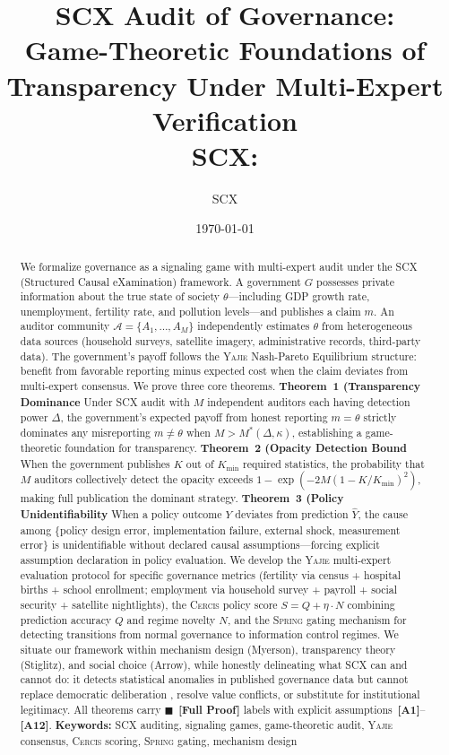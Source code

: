 \documentclass[11pt,a4paper]{article}
\title{\textbf{SCX Audit of Governance:}\\
\large Game-Theoretic Foundations of Transparency Under Multi-Expert Verification\\
\small SCX: }
\author{SCX}
\date{\today}
\theoremstyle{definition}
\newcommand{\rigorFull}[0]{$\blacksquare$~\textbf{[Full Proof]}}
\newcommand{\Yajie}{\textsc{Yajie}}
\newcommand{\Spring}{\textsc{Spring}}
\newcommand{\Cercis}{\textsc{Cercis}}
\newcommand{\SCX}{\textsc{SCX}}
\newcommand{\assumptionTag}[1]{\textsf{\textbf{[A#1]}}}
\begin{document}
\maketitle
\begin{abstract}
We formalize governance as a signaling game with multi-expert audit under the \SCX{} (Structured Causal eXamination) framework. A government $G$ possesses private information about the true state of society $\theta$---including GDP growth rate, unemployment, fertility rate, and pollution levels---and publishes a claim $m$. An auditor community $\mathcal{A} = \{A_1, \ldots, A_M\}$ independently estimates $\theta$ from heterogeneous data sources (household surveys, satellite imagery, administrative records, third-party data). The government's payoff follows the \Yajie{} Nash-Pareto Equilibrium structure: benefit from favorable reporting minus expected cost when the claim deviates from multi-expert consensus. We prove three core theorems. \textbf{Theorem~1 (Transparency Dominance} Under \SCX{} audit with $M$ independent auditors each having detection power $\Delta$, the government's expected payoff from honest reporting $m = \theta$ strictly dominates any misreporting $m \neq \theta$ when $M > M^*(\Delta, \kappa)$, establishing a game-theoretic foundation for transparency. \textbf{Theorem~2 (Opacity Detection Bound} When the government publishes $K$ out of $K_{\min}$ required statistics, the probability that $M$ auditors collectively detect the opacity exceeds $1 - \exp(-2M(1 - K/K_{\min})^2)$, making full publication the dominant strategy. \textbf{Theorem~3 (Policy Unidentifiability} When a policy outcome $Y$ deviates from prediction $\hat{Y}$, the cause among \{policy design error, implementation failure, external shock, measurement error\} is unidentifiable without declared causal assumptions---forcing explicit assumption declaration in policy evaluation. We develop the \Yajie{} multi-expert evaluation protocol for specific governance metrics (fertility via census + hospital births + school enrollment; employment via household survey + payroll + social security + satellite nightlights), the \Cercis{} policy score $S = Q + \eta \cdot N$ combining prediction accuracy $Q$ and regime novelty $N$, and the \Spring{} gating mechanism for detecting transitions from normal governance to information control regimes. We situate our framework within mechanism design (Myerson), transparency theory (Stiglitz), and social choice (Arrow), while honestly delineating what \SCX{} can and cannot do: it detects statistical anomalies in published governance data but cannot replace democratic deliberation , resolve value conflicts, or substitute for institutional legitimacy. All theorems carry \rigorFull{} labels with explicit assumptions~\assumptionTag{1}--\assumptionTag{12}.
\medskip
\noindent\textbf{Keywords:} SCX auditing,  signaling games,  game-theoretic audit,  \Yajie{} consensus,  \Cercis{} scoring,  \Spring{} gating,  mechanism design
\end{abstract}
\end{document}
